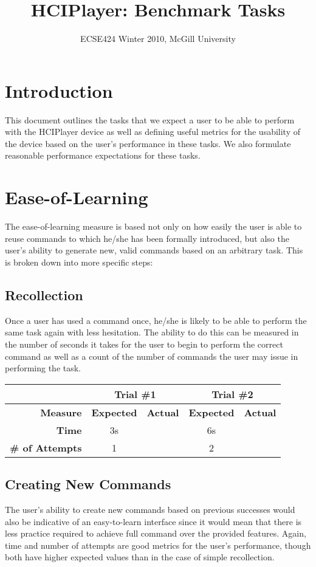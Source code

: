 \documentclass[12pt,letterpaper]{article}
\begin{document}
\title{HCIPlayer: Benchmark Tasks}
\author{ECSE424 Winter 2010, McGill University}
\renewcommand{\today}{Updated: Monday, March 8th, 2010}
\maketitle

\section{Introduction}
This document outlines the tasks that we expect a user to be able to perform with the HCIPlayer device as well as defining useful metrics for the usability of the device based on the user's performance in these tasks. We also formulate reasonable performance expectations for these tasks.

\section{Ease-of-Learning}
The ease-of-learning measure is based not only on how easily the user is able to reuse commands to which he/she has been formally introduced, but also the user's ability to generate new, valid commands based on an arbitrary task. This is broken down into more specific steps:
\subsection{Recollection}
Once a user has used a command once, he/she is likely to be able to perform the same task again with less hesitation. The ability to do this can be measured in the number of seconds it takes for the user to begin to perform the correct command as well as a count of the number of commands the user may issue in performing the task.
\begin{center}\begin{tabular}{|r|c|c|c|c|}
\hline
 & \multicolumn{2}{|c|}{Trial \#1} & \multicolumn{2}{|c|}{Trial \#2} \\
\hline
\textbf{Measure} & \textbf{Expected} & \textbf{Actual} & \textbf{Expected} & \textbf{Actual} \\
\hline
\textbf{Time} & 3s & & 6s & \\
\hline
\textbf{\# of Attempts} & 1 & & 2 & \\
\hline
\end{tabular}\end{center}

\subsection{Creating New Commands}
The user's ability to create new commands based on previous successes would also be indicative of an easy-to-learn interface since it would mean that there is less practice required to achieve full command over the provided features. Again, time and number of attempts are good metrics for the user's performance, though both have higher expected values than in the case of simple recollection.
\end{document}
